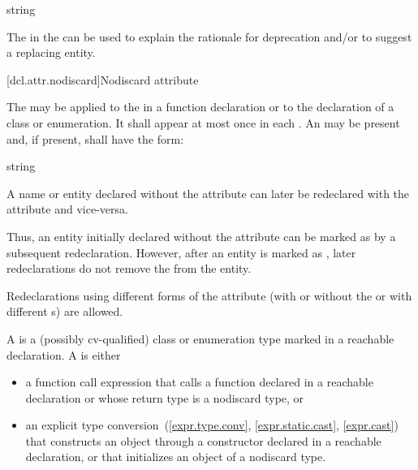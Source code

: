 \documentclass{wg21}
\begin{document}
\begin{ncbnf}
    \terminal{(} string \terminal{)}
\end{ncbnf}

\begin{note}
    The  in the 
    can be used to explain the rationale for deprecation and/or to suggest a replacing entity.
\end{note}

[dcl.attr.nodiscard]{Nodiscard attribute}%

\pnum
The  
may be applied to the 
in a function declaration or to the declaration of a class or enumeration.
It shall appear at most once in each .
An  may be present
and, if present, shall have the form:

\begin{ncbnf}
    \terminal{(} string \terminal{)}
\end{ncbnf}

\pnum
A name or entity declared without the  attribute
can later be redeclared with the attribute and vice-versa.
\begin{note}
    Thus, an entity initially declared without the attribute
    can be marked as 
    by a subsequent redeclaration.
    However, after an entity is marked as ,
    later redeclarations do not remove the 
    from the entity.
\end{note}
Redeclarations using different forms of the attribute
(with or without the 
or with different s)
are allowed.

\pnum
A  is
a (possibly cv-qualified) class or enumeration type
marked  in a reachable declaration.
A  is either
\begin{itemize}
    \item
    a function call expression
    that calls a function declared  in a reachable declaration or
    whose return type is a nodiscard type, or
    \item
    an explicit type
    conversion~(\ref{expr.type.conv}, \ref{expr.static.cast}, \ref{expr.cast})
    that constructs an object through
    a constructor declared  in a reachable declaration, or
    that initializes an object of a nodiscard type.
\end{itemize}
\end{document}
